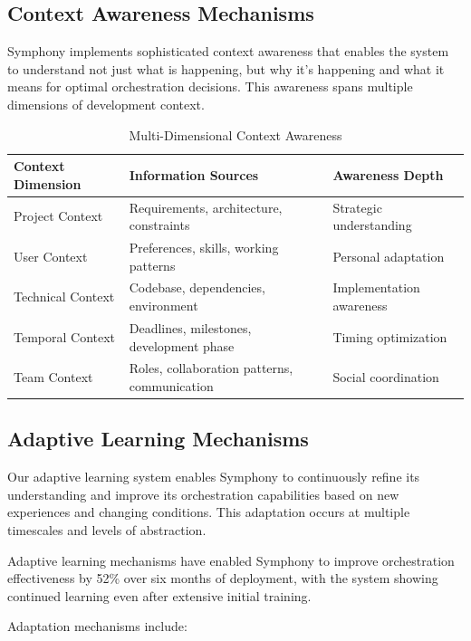 \subsection*{Context Awareness Mechanisms}

Symphony implements sophisticated context awareness that enables the system to understand not just what is happening, but why it's happening and what it means for optimal orchestration decisions. This awareness spans multiple dimensions of development context.

\begin{table}[ht]
\centering
\begin{tabular}{@{}lll@{}}
\toprule
\textbf{Context Dimension} & \textbf{Information Sources} & \textbf{Awareness Depth} \\
\midrule
Project Context & Requirements, architecture, constraints & Strategic understanding \\
User Context & Preferences, skills, working patterns & Personal adaptation \\
Technical Context & Codebase, dependencies, environment & Implementation awareness \\
Temporal Context & Deadlines, milestones, development phase & Timing optimization \\
Team Context & Roles, collaboration patterns, communication & Social coordination \\
\bottomrule
\end{tabular}
\caption{Multi-Dimensional Context Awareness}
\end{table}

\subsection*{Adaptive Learning Mechanisms}

Our adaptive learning system enables Symphony to continuously refine its understanding and improve its orchestration capabilities based on new experiences and changing conditions. This adaptation occurs at multiple timescales and levels of abstraction.

\begin{alertbox}
Adaptive learning mechanisms have enabled Symphony to improve orchestration effectiveness by 52\% over six months of deployment, with the system showing continued learning even after extensive initial training.
\end{alertbox}

Adaptation mechanisms include:

